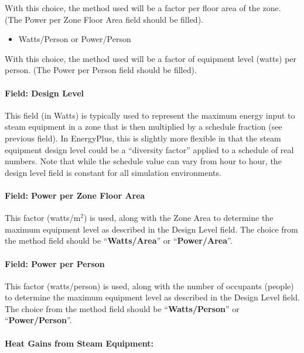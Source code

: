 With this choice, the method used will be a factor per floor area of the zone. (The Power per Zone Floor Area field should be filled).

\begin{itemize}
\tightlist
\item
  Watts/Person or Power/Person
\end{itemize}

With this choice, the method used will be a factor of equipment level (watts) per person. (The Power per Person field should be filled).

\paragraph{Field: Design Level}\label{field-design-level-3}

This field (in Watts) is typically used to represent the maximum energy input to steam equipment in a zone that is then multiplied by a schedule fraction (see previous field). In EnergyPlus, this is slightly more flexible in that the steam equipment design level could be a ``diversity factor'' applied to a schedule of real numbers. Note that while the schedule value can vary from hour to hour, the design level field is constant for all simulation environments.

\paragraph{Field: Power per Zone Floor Area}\label{field-power-per-zone-floor-area-2}

This factor (watts/m\(^{2}\)) is used, along with the Zone Area to determine the maximum equipment level as described in the Design Level field. The choice from the method field should be ``\textbf{Watts/Area}'' or ``\textbf{Power/Area}''.

\paragraph{Field: Power per Person}\label{field-power-per-person-2}

This factor (watts/person) is used, along with the number of occupants (people) to determine the maximum equipment level as described in the Design Level field. The choice from the method field should be ``\textbf{Watts/Person}'' or ``\textbf{Power/Person}''.

\paragraph{Heat Gains from Steam Equipment:}\label{heat-gains-from-steam-equipment}

